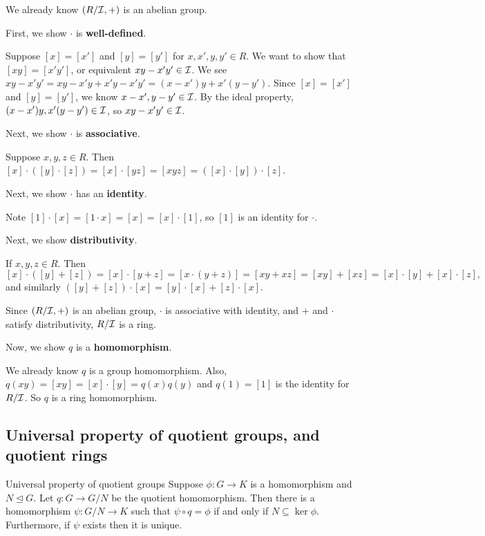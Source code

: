 \documentclass[12pt,letterpaper]{report}
\begin{document}
\begin{thmproof}
  We already know $(R/\mathcal{I}, +)$ is an abelian group.

  First, we show $\cdot$ is \textbf{well-defined}.

  Suppose $[x] = [x']$ and $[y] = [y']$ for $x, x', y, y' \in R$.
  We want to show that $[xy] = [x'y']$, or equivalent $xy - x'y' \in \mathcal{I}$.
  We see $xy - x'y' = xy - x'y + x'y - x'y' = (x - x')y + x'(y - y')$.
  Since $[x] = [x']$ and $[y] = [y']$, we know $x - x', y - y' \in \mathcal{I}$.
  By the ideal property, $(x - x')y, x'(y - y') \in \mathcal{I}$, so $xy - x'y' \in \mathcal{I}$.

  Next, we show $\cdot$ is \textbf{associative}.

  Suppose $x, y, z \in R$.
  Then $[x] \cdot ([y] \cdot [z]) = [x] \cdot [yz] = [xyz] = ([x] \cdot [y]) \cdot [z]$.

  Next, we show $\cdot$ has an \textbf{identity}.

  Note $[1] \cdot [x] = [1 \cdot x] = [x] = [x] \cdot [1]$, so $[1]$ is an identity for $\cdot$.

  Next, we show \textbf{distributivity}.

  If $x, y, z \in R$.
  Then
  \[
    [x] \cdot ([y] + [z]) = [x] \cdot [y + z] = [x \cdot (y + z)] = [xy + xz] = [xy] + [xz]
      = [x] \cdot [y] + [x] \cdot [z],
  \]
  and similarly $([y] + [z]) \cdot [x] = [y] \cdot [x] + [z] \cdot [x]$.

  Since $(R/\mathcal{I}, +)$ is an abelian group, $\cdot$ is associative with identity, and $+$ and
  $\cdot$ satisfy distributivity, $R/\mathcal{I}$ is a ring.

  Now, we show $q$ is a \textbf{homomorphism}.

  We already know $q$ is a group homomorphism.
  Also, $q(xy) = [xy] = [x] \cdot [y] = q(x)q(y)$ and $q(1) = [1]$ is the identity for $R/\mathcal{I}$.
  So $q$ is a ring homomorphism.
\end{thmproof}

\pagebreak
\subsection{Universal property of quotient groups, and quotient rings}

\begin{thm}{Universal property of quotient groups}{}
  Suppose $\phi \colon G \to K$ is a homomorphism and $N \trianglelefteq G$.
  Let $q \colon G \to G/N$ be the quotient homomorphism.
  Then there is a homomorphism $\psi \colon G/N \to K$ such that $\psi \circ q = \phi$ if and only
  if $N \subseteq \ker\phi$.
  Furthermore, if $\psi$ exists then it is unique.
\end{thm}
\end{document}
